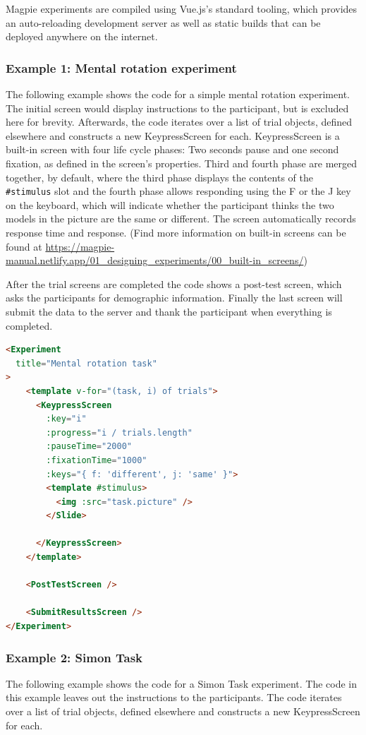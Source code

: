\documentclass[a4paper,10pt]{paper}
\begin{document}
Magpie experiments are compiled using Vue.js's standard tooling, which provides an auto-reloading development server as well as static builds that can be deployed anywhere on the internet.

\subsubsection{Example 1: Mental rotation experiment}
The following example shows the code for a simple mental rotation experiment. The initial screen would display instructions to the participant, but is excluded here for brevity. Afterwards, the code iterates over a list of trial objects, defined elsewhere and constructs a new KeypressScreen for each. KeypressScreen is a built-in screen with four life cycle phases: Two seconds pause and one second fixation, as defined in the screen's properties. Third and fourth phase are merged together, by default, where the third phase displays the contents of the \texttt{\#stimulus} slot and the fourth phase allows responding using the F or the J key on the keyboard, which will indicate whether the participant thinks the two models in the picture are the same or different. The screen automatically records response time and response. (Find more information on built-in screens can be found at \url{https://magpie-manual.netlify.app/01_designing_experiments/00_built-in_screens/})

After the trial screens are completed the code shows a post-test screen, which asks the participants for demographic information. Finally the last screen will submit the data to the server and thank the participant when everything is completed.

\begin{lstlisting}[language=html]
<Experiment
  title="Mental rotation task"
>
    <template v-for="(task, i) of trials">
      <KeypressScreen
        :key="i"
        :progress="i / trials.length"
        :pauseTime="2000"
        :fixationTime="1000"
        :keys="{ f: 'different', j: 'same' }">
        <template #stimulus>
          <img :src="task.picture" />
        </Slide>
        
      </KeypressScreen>
    </template>

    <PostTestScreen />

    <SubmitResultsScreen />
</Experiment>
\end{lstlisting}


\subsubsection{Example 2: Simon Task}
The following example shows the code for a Simon Task experiment. The code in this example leaves out the instructions to the participants. The code iterates over a list of trial objects, defined elsewhere and constructs a new KeypressScreen for each.
\end{document}
